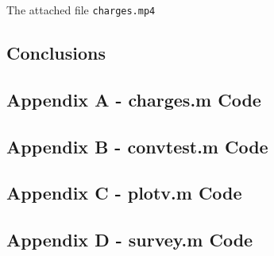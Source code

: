 \documentclass[10pt]{article}
\def\code#1{\texttt{#1}} %
\begin{document}
The attached file \code{charges.mp4}

\pagebreak

\subsection*{Conclusions}





\pagebreak

\subsection*{Appendix A - charges.m Code}


\pagebreak

\subsection*{Appendix B - convtest.m Code}


\pagebreak

\subsection*{Appendix C - plotv.m Code}


\pagebreak

\subsection*{Appendix D - survey.m Code}


\pagebreak
\end{document}
